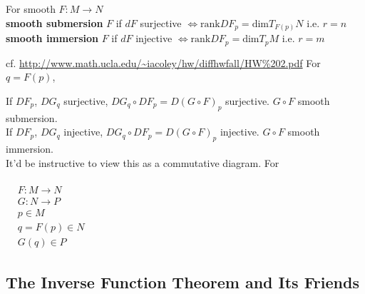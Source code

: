 \begin{definition}
        For smooth $F: M \to N$ \\
        \textbf{smooth submersion} $F$ if $dF$ surjective $\Longleftrightarrow  \text{rank}DF_p = \text{dim} T_{F(p)}N$ i.e. $r=n$ \\
        \textbf{smooth immersion} $F$ if $dF$ injective $\Longleftrightarrow  \text{rank}DF_p = \text{dim} T_{p}M$ i.e. $r=m$ \\
\end{definition}

 cf. \url{http://www.math.ucla.edu/~iacoley/hw/diffhwfall/HW%202.pdf} For $q=F(p)$,

If $DF_p$, $DG_q$ surjective, $DG_q\circ DF_p = D(G\circ F)_p$ surjective.  $G\circ F$ smooth submersion.  \\
If $DF_p$, $DG_q$ injective, $DG_q\circ DF_p = D(G\circ F)_p$ injective.  $G\circ F$ smooth immersion.   \\

It'd be instructive to view this as a commutative diagram.  For 

$\begin{aligned} & \quad \\ 
                 & F: M \to N \\        
                 & G : N \to P \\
                 & p \in M \\
                 & q = F(p) \in N \\
                 & G(q) \in P \end{aligned}$  




\subsection*{ The Inverse Function Theorem and Its Friends }

